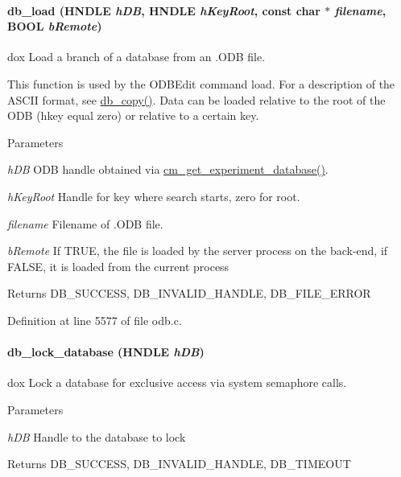 \paragraph[{db\_\-load}]{ db\_\-load (HNDLE {\em hDB}, \/  HNDLE {\em hKeyRoot}, \/  const char $\ast$ {\em filename}, \/  {\bf BOOL} {\em bRemote})}\hfill\label{group__odbfunctionc_ga437034642fc8851bfa67937635cb7d12}
dox Load a branch of a database from an .ODB file.

This function is used by the ODBEdit command load. For a description of the ASCII format, see \hyperlink{group__odbfunctionc_ga165f2428c082852ff2ac1e8c4c78d607}{db\_\-copy()}. Data can be loaded relative to the root of the ODB (hkey equal zero) or relative to a certain key. 
\begin{DoxyParams}{Parameters}
\item[{\em hDB}]ODB handle obtained via \hyperlink{group__cmfunctionc_ga16b33b70783a3f5ba98b4094149d12b7}{cm\_\-get\_\-experiment\_\-database()}. \item[{\em hKeyRoot}]Handle for key where search starts, zero for root. \item[{\em filename}]Filename of .ODB file. \item[{\em bRemote}]If TRUE, the file is loaded by the server process on the back-\/end, if FALSE, it is loaded from the current process \end{DoxyParams}
\begin{DoxyReturn}{Returns}
DB\_\-SUCCESS, DB\_\-INVALID\_\-HANDLE, DB\_\-FILE\_\-ERROR 
\end{DoxyReturn}


Definition at line 5577 of file odb.c.
\paragraph[{db\_\-lock\_\-database}]{ db\_\-lock\_\-database (HNDLE {\em hDB})}\hfill\label{group__odbfunctionc_ga299048aeed427690630027aa5aebc451}
dox Lock a database for exclusive access via system semaphore calls. 
\begin{DoxyParams}{Parameters}
\item[{\em hDB}]Handle to the database to lock \end{DoxyParams}
\begin{DoxyReturn}{Returns}
DB\_\-SUCCESS, DB\_\-INVALID\_\-HANDLE, DB\_\-TIMEOUT 
\end{DoxyReturn}


